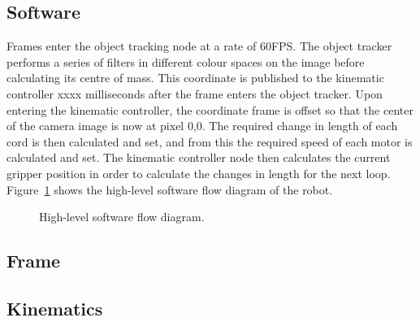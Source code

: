 \documentclass[conference]{IEEEtran}
\begin{document}
\subsection{Software}
Frames enter the object tracking node at a rate of 60FPS. The object tracker performs a series of filters in different colour spaces on the image before calculating its centre of mass. This coordinate is published to the kinematic controller xxxx milliseconds after the frame enters the object tracker. Upon entering the kinematic controller, the coordinate frame is offset so that the center of the camera image is now at pixel 0,0. The required change in length of each cord is then calculated and set, and from this the required speed of each motor is calculated and set. The kinematic controller node then calculates the current gripper position in order to calculate the changes in length for the next loop.
Figure~\ref{fig:HighLevelDiagram} shows the high-level software flow diagram of the robot.
\begin{figure}[htbp]
	\centerline{%
	}
	\caption{High-level software flow diagram.}
	\label{fig:HighLevelDiagram}
	\end{figure}
\subsection{Frame}
\subsection{Kinematics}
\end{document}
